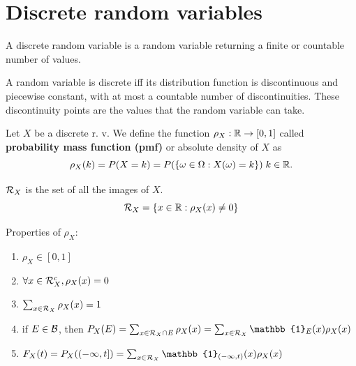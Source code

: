 \section{Discrete random variables}
\begin{definition}
    A discrete random variable is a random variable returning a finite or countable number of values.
\end{definition}
\begin{remark}
    A random variable is discrete iff its distribution function is discontinuous and piecewise constant, with at most a countable number of discontinuities. These discontinuity points are the values that the random variable can take.
\end{remark}
\begin{definition}
    Let $X$ be a discrete r. v. We define the function $\rho_X:\mathbb{R}\to[0,1]$ called \textbf{probability mass function (pmf)} or absolute density of $X$ as
    \begin{equation*}
        \rho_X(k)=P(X=k)=P(\{\omega \in \Omega:X(\omega)=k\}) \; k\in\mathbb{R}.
    \end{equation*}
\end{definition}
\begin{definition}
    $\mathcal{R}_X$ is the set of all the images of $X$.
    \begin{equation*}
        \mathcal{R}_X=\{x \in \mathbb{R}: \rho_X(x)\ne 0\}
    \end{equation*}
\end{definition}
Properties of $\rho_X$:
\begin{enumerate}
    \item $\rho_X \in [0, 1]$
    \item $\forall x \in \mathcal{R}_X^c, \rho_X(x)=0$
    \item $\sum_{x \in \mathcal{R}_X}\rho_X(x)=1 $
    \item if $E \in \mathcal{B}$, then $P_X(E)=\sum_{x \in \calR_X\cap E}\rho_X(x)=\sum_{x \in \calR_X}\mathbb{1}_E(x)\rho_X(x)$
    \item $F_X(t)=P_X((-\infty,t])=\sum_{x \in \calR_X}\mathbb{1}_{(-\infty, t)}(x)\rho_X(x)$
\end{enumerate}

